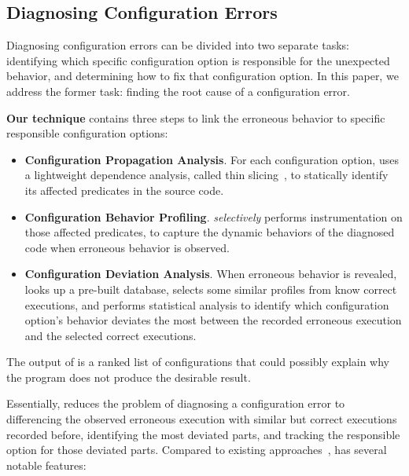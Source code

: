 
\subsection{Diagnosing Configuration Errors}

Diagnosing configuration errors can be divided into two
separate tasks: identifying which specific configuration option is
responsible for the unexpected behavior, and determining how to fix that
configuration option. In this paper, we address the former task: finding
the root cause of a configuration error.


\textbf{Our technique} contains three steps to 
link the erroneous behavior to specific responsible configuration options:

\begin{itemize}
\item \textbf{Configuration Propagation Analysis}. For
each configuration option, \ourtool
uses a lightweight dependence analysis, called thin slicing~\cite{Sridharan:2007},
to statically identify its affected predicates in the source code.

\item \textbf{Configuration Behavior Profiling}. \ourtool
\textit{selectively} performs instrumentation on those
affected predicates, to capture the
dynamic behaviors of the diagnosed code when erroneous behavior
is observed.

\item \textbf{Configuration Deviation Analysis}.
When erroneous behavior is revealed, \ourtool looks up a
pre-built database, selects some similar profiles
from know correct executions, and performs statistical analysis
to identify which configuration option's behavior deviates the most
between the recorded erroneous execution and the selected
correct executions.

\end{itemize}

The output of \ourtool is a ranked list of
configurations that could possibly explain why the program does not produce the desirable result. 

Essentially, \ourtool reduces the problem of diagnosing a
configuration error to differencing the observed erroneous 
execution with similar but correct executions recorded before,
identifying the most deviated parts, and tracking the responsible
option for those deviated parts.
Compared to existing approaches~\cite{Zeller:2002:ICC, Zhang:2003:PDS,
Rabkin:2011:PPC, Whitaker:2004:CDS, Attariyan:2010:ACT, Wang:2004:AMT}, \ourtool has
several notable features:

